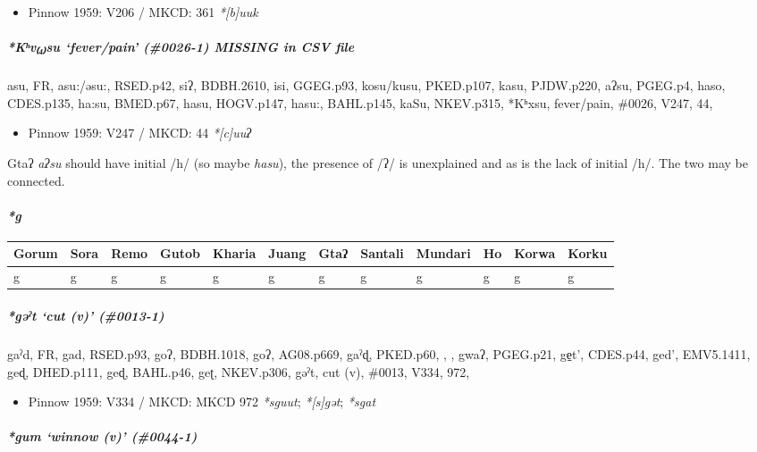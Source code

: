 \documentclass[a4paper,]{article}
\providecommand{\tightlist}{%
  \setlength{\itemsep}{0pt}\setlength{\parskip}{0pt}}
\let\oldparagraph\paragraph
\renewcommand{\paragraph}[1]{\oldparagraph{#1}\mbox{}}
\let\oldsubparagraph\subparagraph
\renewcommand{\subparagraph}[1]{\oldsubparagraph{#1}\mbox{}}
\begin{document}
\begin{itemize}
\tightlist
\item
  Pinnow 1959: V206 / MKCD: 361 \emph{*{[}b{]}uuk}
\end{itemize}

\subparagraph{\texorpdfstring{\emph{*Kʰv₍₄₎su} `fever/pain' (\#0026-1)
MISSING in CSV
file}{*Kʰv₍₄₎su fever/pain (\#0026-1) MISSING in CSV file}}\label{kux2b0vsu-feverpain-0026-1-missing-in-csv-file}

asu, FR, asu:/əsu:, RSED.p42, siʔ, BDBH.2610, isi, GGEG.p93, kosu/kusu,
PKED.p107, kasu, PJDW.p220, aʔsu, PGEG.p4, haso, CDES.p135, ha:su,
BMED.p67, hasu, HOGV.p147, hasu:, BAHL.p145, kaSu, NKEV.p315, *Kʰxsu,
fever/pain, \#0026, V247, 44,

\begin{itemize}
\tightlist
\item
  Pinnow 1959: V247 / MKCD: 44 \emph{*{[}c{]}uuʔ}
\end{itemize}

Gtaʔ \emph{aʔsu} should have initial /h/ (so maybe \emph{hasu}), the
presence of /ʔ/ is unexplained and as is the lack of initial /h/. The
two may be connected.

\paragraph{\texorpdfstring{\emph{*g}}{*g}}\label{g}

\begin{longtable}[]{@{}llllllllllll@{}}
\toprule
Gorum & Sora & Remo & Gutob & Kharia & Juang & Gtaʔ & Santali & Mundari
& Ho & Korwa & Korku\tabularnewline
\midrule
\endhead
g & g & g & g & g & g & g & g & g & g & g & g\tabularnewline
\bottomrule
\end{longtable}

\subparagraph{\texorpdfstring{\emph{*gəˀt} `cut (v)'
(\#0013-1)}{*gəˀt cut (v) (\#0013-1)}}\label{gux259ux2c0t-cut-v-0013-1}

gaˀd, FR, gad, RSED.p93, goʔ, BDBH.1018, goʔ, AG08.p669, gaˀɖ, PKED.p60,
, , gwaʔ, PGEG.p21, ge̠t', CDES.p44, ged', EMV5.1411, geɖ, DHED.p111,
geɖ, BAHL.p46, geʈ, NKEV.p306, gəˀt, cut (v), \#0013, V334, 972,

\begin{itemize}
\tightlist
\item
  Pinnow 1959: V334 / MKCD: MKCD 972 \emph{*sguut}; \emph{*{[}s{]}gət};
  \emph{*sgat}
\end{itemize}

\subparagraph{\texorpdfstring{\emph{*gum} `winnow (v)'
(\#0044-1)}{*gum winnow (v) (\#0044-1)}}\label{gum-winnow-v-0044-1}
\end{document}
